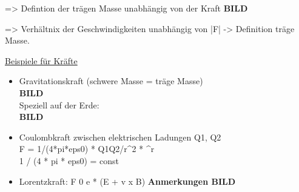 => Defintion der trägen Masse unabhängig von der Kraft
\textbf{BILD}

=> Verhältnix der Geschwindigkeiten unabhängig von |F| -> Definition träge Masse.

\underline{Beispiele für Kräfte}
\begin{itemize}
  \item Gravitationskraft (schwere Masse = träge Masse)\\
        \textbf{BILD}\\
        Speziell auf der Erde:\\ \textbf{BILD}
  \item Coulombkraft zwischen elektrischen Ladungen Q1, Q2\\
        F = 1/(4*pi*eps0) * Q1Q2/r^2 * ^r\\
        1 / (4 * pi * eps0) = const
  \item Lorentzkraft: F 0 e * (E + v x B) \textbf{Anmerkungen BILD}
\end{itemize}